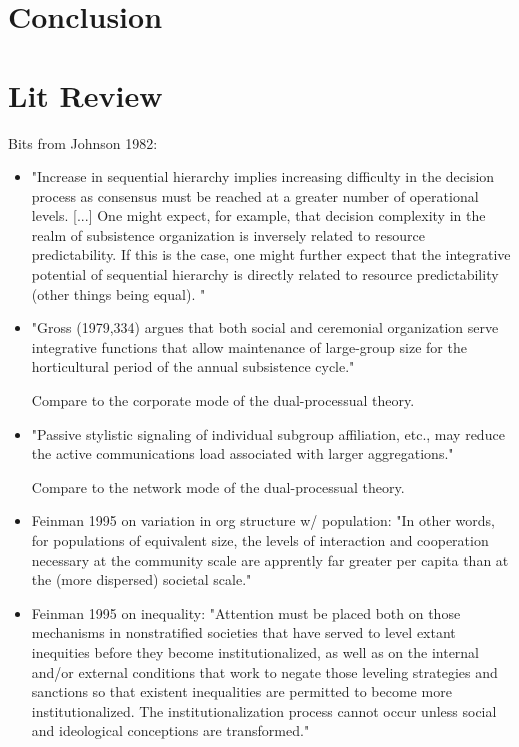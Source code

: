\documentclass[11pt,oneside,a4paper,onecolumn]{article}
\begin{document}
\section{Conclusion}

\section{Lit Review}

Bits from Johnson 1982:
\begin{itemize}
	\item "Increase in sequential hierarchy implies increasing difficulty in the decision
process as consensus must be reached at a greater number of operational levels. [...] One might expect, for example, that decision complexity in the realm of subsistence organization is inversely related to resource predictability. If this is the case, one might further expect that the integrative potential of sequential hierarchy is directly related to resource predictability (other things being equal). " \\

	\item "Gross (1979,334) argues that both social and ceremonial organization serve integrative functions that allow maintenance of large-group size for the horticultural period of the annual subsistence cycle."

Compare to the corporate mode of the dual-processual theory.

	\item "Passive stylistic signaling of individual subgroup affiliation, etc., may reduce
the active communications load associated with larger aggregations."

Compare to the network mode of the dual-processual theory.

	\item Feinman 1995 on variation in org structure w/ population:  "In other words, for populations of equivalent size, the levels of interaction and cooperation necessary at the community scale are apprently far greater per capita than at the (more dispersed) societal scale."

	\item Feinman 1995 on inequality: "Attention must be placed both on those mechanisms in nonstratified societies that have served to level extant inequities before they become institutionalized, as well as on the internal and/or external conditions that work to negate those leveling strategies and sanctions so that existent inequalities are permitted to become more institutionalized.  The institutionalization process cannot occur unless social and ideological conceptions are transformed." 


\end{itemize}
\end{document}
